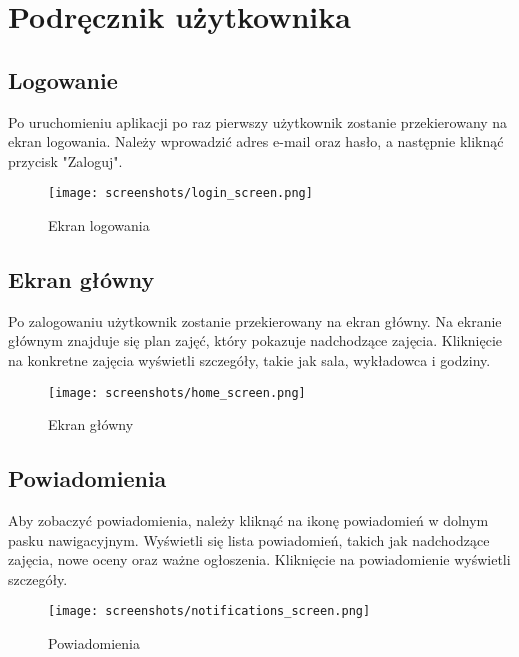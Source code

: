 	\newpage
\section{Podręcznik użytkownika}  %
\subsection{Logowanie}

Po uruchomieniu aplikacji po raz pierwszy użytkownik zostanie przekierowany na ekran logowania. Należy wprowadzić adres e-mail oraz hasło, a następnie kliknąć przycisk "Zaloguj".

\begin{figure}[h!]
  \centering
  \texttt{[image: screenshots/login\_screen.png]}
  \caption{Ekran logowania}
  \label{fig:login_screen}
\end{figure}

\subsection{Ekran główny}

Po zalogowaniu użytkownik zostanie przekierowany na ekran główny. Na ekranie głównym znajduje się plan zajęć, który pokazuje nadchodzące zajęcia. Kliknięcie na konkretne zajęcia wyświetli szczegóły, takie jak sala, wykładowca i godziny.

\begin{figure}[h!]
  \centering
  \texttt{[image: screenshots/home\_screen.png]}
  \caption{Ekran główny}
  \label{fig:home_screen}
\end{figure}

\subsection{Powiadomienia}

Aby zobaczyć powiadomienia, należy kliknąć na ikonę powiadomień w dolnym pasku nawigacyjnym. Wyświetli się lista powiadomień, takich jak nadchodzące zajęcia, nowe oceny oraz ważne ogłoszenia. Kliknięcie na powiadomienie wyświetli szczegóły.

\begin{figure}[h!]
  \centering
  \texttt{[image: screenshots/notifications\_screen.png]}
  \caption{Powiadomienia}
  \label{fig:notifications_screen}
\end{figure}

